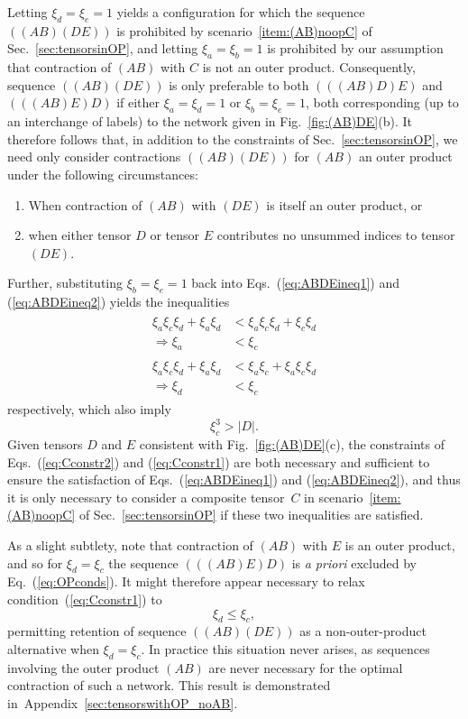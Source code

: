 \documentclass[aps,pre,reprint,superscriptaddress,amsfonts,amsmath,showpacs,nofootinbib,floatfix]{revtex4-1}
\newcommand{\eref}[1]{(\ref{#1})}
\newcommand{\Eref}[1]{Eq.~(\ref{#1})}
\newcommand{\Erefs}[2]{Eqs.~(\ref{#1}) and (\ref{#2})}
\newcommand{\fref}[1]{Fig.~\ref{#1}}
\newcommand{\sref}[1]{Sec.~\ref{#1}}
\newcommand{\scref}[1]{scenario~\ref{#1}}
\newcommand{\aref}[1]{Appendix~\ref{#1}}
\newcommand{\xa}{\xi_a}
\newcommand{\xb}{\xi_b}
\newcommand{\xc}{\xi_c}
\newcommand{\xd}{\xi_d}
\newcommand{\xe}{\xi_e}
\begin{document}
Letting $\xd=\xe=1$ yields a configuration for which the sequence $((AB)(DE))$ is prohibited by \scref{item:(AB)noopC} of \sref{sec:tensorsinOP}, and letting $\xa=\xb=1$ is prohibited by our assumption that contraction of $(AB)$ with $C$ is not an outer product. Consequently, sequence $((AB)(DE))$ is only preferable to both $(((AB)D)E)$ and $(((AB)E)D)$ if either $\xa=\xd=1$ or $\xb=\xe=1$, both corresponding (up to an interchange of labels) to the network given in \fref{fig:(AB)DE}(b). It therefore follows that, in addition to the constraints of \sref{sec:tensorsinOP}, we need only consider contractions $((AB)(DE))$ for $(AB)$ an outer product under the following circumstances:
\begin{enumerate}
\item When contraction of $(AB)$ with $(DE)$ is itself an outer product, or
\item when either tensor $D$ or tensor $E$ contributes no unsummed indices to tensor $(DE)$.
\end{enumerate}
Further, substituting $\xb=\xe=1$ back into \Erefs{eq:ABDEineq1}{eq:ABDEineq2} yields the inequalities
\begin{align}
\begin{split}
\xa\xc\xd+\xa\xd&<\xa\xc\xd+\xc\xd\\
\Rightarrow \xa&<\xc\label{eq:Cconstr2}
\end{split}\\
\begin{split}
\xa\xc\xd+\xa\xd&<\xa\xc+\xa\xc\xd\\
\Rightarrow \xd&<\xc\label{eq:Cconstr1}
\end{split}
\end{align}
respectively, which also imply
\begin{equation}
\xc^3>|D|.\label{eq:cubevsD}
\end{equation}
Given tensors $D$ and $E$ consistent with \fref{fig:(AB)DE}(c), the constraints of \Erefs{eq:Cconstr2}{eq:Cconstr1} are both necessary and sufficient to ensure the satisfaction of \Erefs{eq:ABDEineq1}{eq:ABDEineq2}, and thus it is only necessary to consider a composite tensor~$C$ in \scref{item:(AB)noopC} of \sref{sec:tensorsinOP} if these two inequalities are satisfied.

As a slight subtlety, note that contraction of $(AB)$ with $E$ is an outer product, and so for $\xd=\xc$ the sequence $(((AB)E)D)$ is \emph{a priori} excluded by \Eref{eq:OPconds}. It might therefore appear necessary to relax condition~\eref{eq:Cconstr1} to 
\begin{equation}
\xd\leq\xc, \label{eq:Cconstr3}
\end{equation}
permitting retention of sequence $((AB)(DE))$ as a non-outer-product alternative when $\xd=\xc$. In practice this situation never arises, as sequences involving the outer product $(AB)$ are never necessary for the optimal contraction of such a network. This result is demonstrated in~\aref{sec:tensorswithOP_noAB}.
\end{document}
